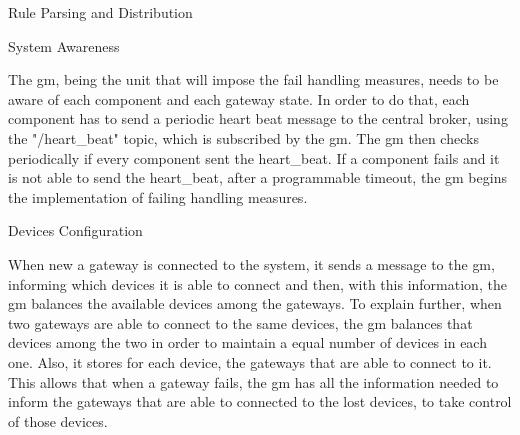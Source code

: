 \begin{Paragraph}{Rule Parsing and Distribution}
\end{Paragraph}

\begin{Paragraph}{System Awareness}

The \ac{gm}, being the unit that will impose the fail handling measures, needs to be aware of each component and each gateway state. In order to do that, each component has to send a periodic heart beat message to the central broker, using the "/heart\_beat" topic, which is subscribed by the \ac{gm}. The \ac{gm} then checks periodically if every component sent the heart\_beat. If a component fails and it is not able to send the heart\_beat, after a programmable timeout, the \ac{gm} begins the implementation of failing handling measures.

\end{Paragraph}

\begin{Paragraph}{Devices Configuration}

When new a gateway is connected to the system, it sends a message to the \ac{gm}, informing which devices it is able to connect and then, with this information, the \ac{gm} balances the available devices among the gateways. To explain further, when two gateways are able to connect to the same devices, the \ac{gm} balances that devices among the two in order to maintain a equal number of devices in each one. Also, it stores for each device, the gateways that are able to connect to it. This allows that when a gateway fails, the \ac{gm} has all the information needed to inform the gateways that are able to connected to the lost devices, to take control of those devices.

\end{Paragraph}

